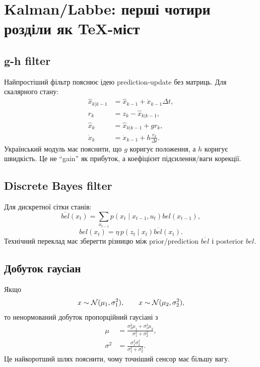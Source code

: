 \section{Kalman/Labbe: перші чотири розділи як TeX-міст}

\subsection{g-h filter}

Найпростіший фільтр пояснює ідею prediction-update без матриць. Для скалярного стану:
\begin{align}
 \hat x_{k|k-1} &= \hat x_{k-1}+\dot x_{k-1}\Delta t,\\
 r_k &= z_k-\hat x_{k|k-1},\\
 \hat x_k &= \hat x_{k|k-1}+g r_k,\\
 \dot x_k &= \dot x_{k-1}+h\frac{r_k}{\Delta t}.
\end{align}
Український модуль має пояснити, що $g$ коригує положення, а $h$ коригує швидкість. Це не ``gain'' як прибуток, а коефіцієнт підсилення/ваги корекції.

\subsection{Discrete Bayes filter}

Для дискретної сітки станів:
\begin{equation}
 \overline{bel}(x_t)=\sum_{x_{t-1}}p(x_t\mid x_{t-1},u_t)bel(x_{t-1}),
\end{equation}
\begin{equation}
 bel(x_t)=\eta\,p(z_t\mid x_t)\overline{bel}(x_t).
\end{equation}
Технічний переклад має зберегти різницю між prior/prediction $\overline{bel}$ і posterior $bel$.

\subsection{Добуток гаусіан}

Якщо
\begin{equation}
 x\sim\mathcal{N}(\mu_1,\sigma_1^2),\qquad x\sim\mathcal{N}(\mu_2,\sigma_2^2),
\end{equation}
то ненормований добуток пропорційний гаусіані з
\begin{align}
 \mu &= \frac{\sigma_2^2\mu_1+\sigma_1^2\mu_2}{\sigma_1^2+\sigma_2^2},\\
 \sigma^2 &= \frac{\sigma_1^2\sigma_2^2}{\sigma_1^2+\sigma_2^2}.
\end{align}
Це найкоротший шлях пояснити, чому точніший сенсор має більшу вагу.

